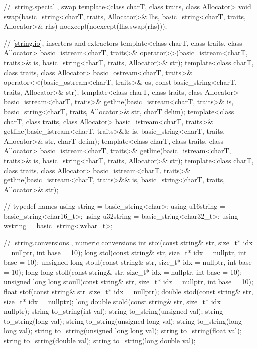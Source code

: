 \begin{codeblock}
{  // \ref{string.special}, swap
  template<class charT, class traits, class Allocator>
    void swap(basic_string<charT, traits, Allocator>& lhs,
              basic_string<charT, traits, Allocator>& rhs)
      noexcept(noexcept(lhs.swap(rhs)));

  // \ref{string.io}, inserters and extractors
  template<class charT, class traits, class Allocator>
    basic_istream<charT, traits>&
      operator>>(basic_istream<charT, traits>& is,
                 basic_string<charT, traits, Allocator>& str);
  template<class charT, class traits, class Allocator>
    basic_ostream<charT, traits>&
      operator<<(basic_ostream<charT, traits>& os,
                 const basic_string<charT, traits, Allocator>& str);
  template<class charT, class traits, class Allocator>
    basic_istream<charT, traits>&
      getline(basic_istream<charT, traits>& is,
              basic_string<charT, traits, Allocator>& str,
              charT delim);
  template<class charT, class traits, class Allocator>
    basic_istream<charT, traits>&
      getline(basic_istream<charT, traits>&& is,
              basic_string<charT, traits, Allocator>& str,
              charT delim);
  template<class charT, class traits, class Allocator>
    basic_istream<charT, traits>&
      getline(basic_istream<charT, traits>& is,
              basic_string<charT, traits, Allocator>& str);
  template<class charT, class traits, class Allocator>
    basic_istream<charT, traits>&
      getline(basic_istream<charT, traits>&& is,
              basic_string<charT, traits, Allocator>& str);

  //  typedef names
  using string    = basic_string<char>;
  using u16string = basic_string<char16_t>;
  using u32string = basic_string<char32_t>;
  using wstring   = basic_string<wchar_t>;

  // \ref{string.conversions}, numeric conversions
  int stoi(const string& str, size_t* idx = nullptr, int base = 10);
  long stol(const string& str, size_t* idx = nullptr, int base = 10);
  unsigned long stoul(const string& str, size_t* idx = nullptr, int base = 10);
  long long stoll(const string& str, size_t* idx = nullptr, int base = 10);
  unsigned long long stoull(const string& str, size_t* idx = nullptr, int base = 10);
  float stof(const string& str, size_t* idx = nullptr);
  double stod(const string& str, size_t* idx = nullptr);
  long double stold(const string& str, size_t* idx = nullptr);
  string to_string(int val);
  string to_string(unsigned val);
  string to_string(long val);
  string to_string(unsigned long val);
  string to_string(long long val);
  string to_string(unsigned long long val);
  string to_string(float val);
  string to_string(double val);
  string to_string(long double val);

}
\end{codeblock}
